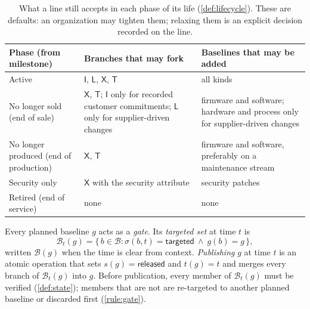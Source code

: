 \begin{table}[tbp]
  \centering
  \small
  \caption{What a line still accepts in each phase of its life
    (\cref{def:lifecycle}). These are defaults: an organization may
    tighten them; relaxing them is an explicit decision recorded on the
    line.}
  \label{tab:phases}
  \begin{tabularx}{\linewidth}{@{}>{\raggedright\arraybackslash}p{3.2cm}
      >{\raggedright\arraybackslash}X
      >{\raggedright\arraybackslash}X@{}}
    \toprule
    \textbf{Phase (from milestone)} & \textbf{Branches that may fork}
      & \textbf{Baselines that may be added} \\
    \midrule
    Active & $\mathsf{I}$, $\mathsf{L}$, $\mathsf{X}$, $\mathsf{T}$
      & all kinds \\
    No longer sold (end of sale)
      & $\mathsf{X}$, $\mathsf{T}$; $\mathsf{I}$ only for recorded customer
        commitments; $\mathsf{L}$ only for supplier-driven changes
      & firmware and software; hardware and process only for
        supplier-driven changes \\
    No longer produced (end of production)
      & $\mathsf{X}$, $\mathsf{T}$
      & firmware and software, preferably on a maintenance stream \\
    Security only
      & $\mathsf{X}$ with the security attribute
      & security patches \\
    Retired (end of service) & none & none \\
    \bottomrule
  \end{tabularx}
\end{table}

\begin{definition}
  \label{def:gate}
  Every planned baseline $g$ acts as a \emph{gate}. Its \emph{targeted
  set} at time $t$ is
  \[
    \mathcal{B}_t(g) = \{\, b \in \mathcal{B} : \sigma(b,t) =
    \textsf{targeted} \ \wedge\ g(b) = g \,\},
  \]
  written $\mathcal{B}(g)$ when the time is clear from context.
  \emph{Publishing} $g$ at time $t$ is an atomic operation that sets
  $s(g) = \textsf{released}$ and $t(g) = t$ and merges every branch of
  $\mathcal{B}_t(g)$ into $g$. Before publication, every member of
  $\mathcal{B}_t(g)$ must be verified (\cref{def:state}); members that are
  not are re-targeted to another planned baseline or discarded first
  (\cref{rule:gate}).
\end{definition}


